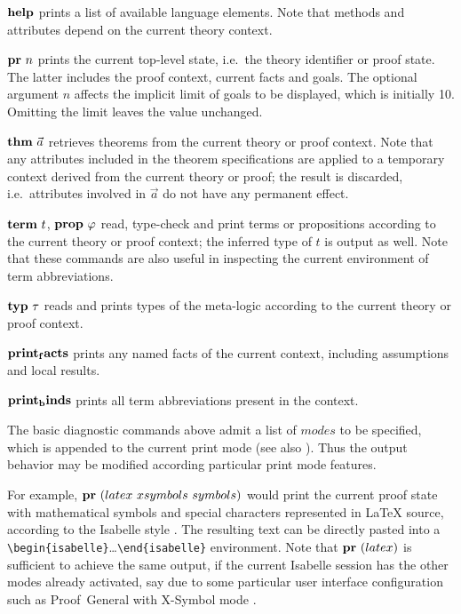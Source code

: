 \begin{descr}
\item [${\mathord{\mathbf{help}}}$] prints a list of available language elements.
  Note that methods and attributes depend on the current theory context.
\item [${\mathord{\mathbf{pr}}}~n$] prints the current top-level state, i.e.\ the
  theory identifier or proof state.  The latter includes the proof context,
  current facts and goals.  The optional argument $n$ affects the implicit
  limit of goals to be displayed, which is initially 10.  Omitting the limit
  leaves the value unchanged.
\item [${\mathord{\mathbf{thm}}}~\vec a$] retrieves theorems from the current theory
  or proof context.  Note that any attributes included in the theorem
  specifications are applied to a temporary context derived from the current
  theory or proof; the result is discarded, i.e.\ attributes involved in $\vec
  a$ do not have any permanent effect.
\item [${\mathord{\mathbf{term}}}~t$, ${\mathord{\mathbf{prop}}}~\varphi$] read, type-check and
  print terms or propositions according to the current theory or proof
  context; the inferred type of $t$ is output as well.  Note that these
  commands are also useful in inspecting the current environment of term
  abbreviations.
\item [${\mathord{\mathbf{typ}}}~\tau$] reads and prints types of the meta-logic
  according to the current theory or proof context.
\item [${\mathord{\mathbf{print_facts}}}$] prints any named facts of the current
  context, including assumptions and local results.
\item [${\mathord{\mathbf{print_binds}}}$] prints all term abbreviations present in
  the context.
\end{descr}

The basic diagnostic commands above admit a list of $modes$ to be specified,
which is appended to the current print mode (see also \cite{isabelle-ref}).
Thus the output behavior may be modified according particular print mode
features.

For example, ${\mathord{\mathbf{pr}}}~(latex~xsymbols~symbols)$ would print the
current proof state with mathematical symbols and special characters
represented in {\LaTeX} source, according to the Isabelle style
\cite{isabelle-sys}.  The resulting text can be directly pasted into a
\verb,\begin{isabelle},\dots\verb,\end{isabelle}, environment.  Note that
${\mathord{\mathbf{pr}}}~(latex)$ is sufficient to achieve the same output, if the
current Isabelle session has the other modes already activated, say due to
some particular user interface configuration such as Proof~General
\cite{proofgeneral,Aspinall:TACAS:2000} with X-Symbol mode \cite{x-symbol}.


